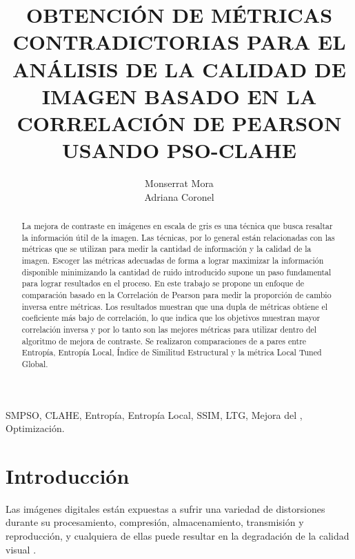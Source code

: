 \documentclass[spanish,twocolumn]{article}
\title{OBTENCIÓN DE MÉTRICAS CONTRADICTORIAS PARA EL ANÁLISIS DE LA CALIDAD DE IMAGEN BASADO EN LA CORRELACIÓN DE PEARSON USANDO PSO-CLAHE}
\author{Monserrat Mora \\ Adriana Coronel}
\begin{document}
%	
\maketitle
%
\begin{abstract}


La mejora de contraste en imágenes en escala de gris es una técnica que busca resaltar la información útil de la imagen. Las técnicas, por lo general están relacionadas con las métricas que se utilizan para medir la cantidad de información y la calidad de la imagen. Escoger las métricas adecuadas de forma a lograr maximizar la información disponible minimizando la cantidad de ruido introducido supone un paso fundamental para lograr resultados en el proceso. En este trabajo se propone un enfoque de comparación basado en la Correlación de Pearson para medir la proporción de cambio inversa entre métricas. Los resultados muestran que una dupla de métricas obtiene el coeficiente más bajo de correlación, lo que indica que los objetivos muestran mayor correlación inversa y por lo tanto son las mejores métricas para utilizar dentro del algoritmo de mejora de contraste. Se realizaron comparaciones de a pares entre Entropía, Entropía Local, Índice de Similitud Estructural y la métrica Local Tuned Global.


\end{abstract}
%
\begin{keywords}
SMPSO, CLAHE, Entropía, Entropía Local, SSIM, LTG, Mejora del , Optimización.
\end{keywords}
%
\section{Introducción}
\label{sec:intro}
Las imágenes digitales están expuestas a sufrir una variedad de distorsiones durante su procesamiento, compresión, almacenamiento, transmisión y reproducción, y cualquiera de ellas puede resultar en la degradación de la calidad visual \cite{digitalimganalysis}.
\end{document}
